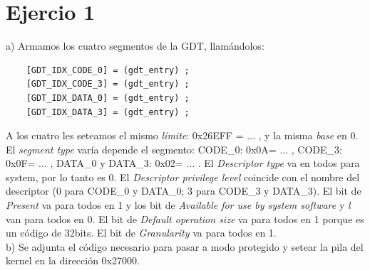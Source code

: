 \documentclass[a4paper]{article}
\begin{document}
\thispagestyle{empty}


\maketitle
\newpage


\newpage


\newpage
\section{Ejercio 1}
{\large a)} Armamos los cuatro segmentos de la GDT, llam\'andolos: 
\begin{codesnippet}
\begin{verbatim}
    [GDT_IDX_CODE_0] = (gdt_entry) ; 
    [GDT_IDX_CODE_3] = (gdt_entry) ; 
    [GDT_IDX_DATA_0] = (gdt_entry) ;  
    [GDT_IDX_DATA_3] = (gdt_entry) ; 
\end{verbatim}
\end{codesnippet}
    
A los cuatro les seteamos el mismo \emph{l\'imite}: 0x26EFF = ... , y la misma \emph{base} en 0. El \emph{segment type} var\'ia depende el segmento: CODE_0: 0x0A= ... , CODE_3: 0x0F= ... , DATA_0 y DATA_3: 0x02= ... . El \emph{Descriptor type} va en todos para system, por lo tanto es 0. El \emph{Descriptor privilege level} coincide con el nombre del descriptor (0 para CODE_0 y DATA_0; 3 para CODE_3 y DATA_3). El bit de \emph{Present} va para todos en 1 y los bit de \emph{Available for use by system software} y \emph{l} van para todos en 0. El bit de \emph{Default operation size} va para todos en 1 porque es un c\'odigo de 32bits. El bit de \emph{Granularity} va para todos en 1.\\
    


{\large b)} Se adjunta el c\'odigo necesario para pasar a modo protegido y setear la pila del kernel en
la direcci\'on 0x27000.
\end{document}
